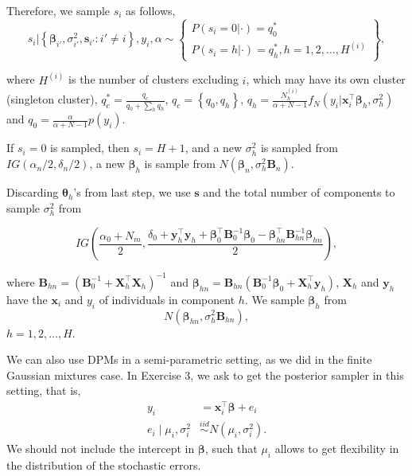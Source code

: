 Therefore, we sample $s_i$ as follows,
\begin{equation*}
	s_i|\left\{\boldsymbol\beta_{i'},\sigma_{i'}^2,\boldsymbol s_{i'}:i'\neq i\right\}, y_i, \alpha\sim\begin{Bmatrix}P(s_i=0|\cdot)=q_0^*\\
		P(s_i=h|\cdot)=q_h^*, h=1,2,\dots,H^{(i)}\end{Bmatrix},
\end{equation*}

where $H^{(i)}$ is the number of clusters excluding $i$, which may have its own cluster (singleton cluster), $q^*_c=\frac{q_c}{q_0+\sum_h q_h}$, $q_c=\left\{q_0,q_h\right\}$, $q_h=\frac{N_h^{(i)}}{\alpha+N-1}f_N(y_i|\boldsymbol{x}_i^{\top}\boldsymbol\beta_h,\sigma_h^2)$ and $q_0=\frac{\alpha}{\alpha+N-1}p(y_i)$.

If $s_i=0$ is sampled, then $s_i=H+1$, and a new $\sigma_h^2$ is sampled from $IG\left(\alpha_n/2,\delta_n/2\right)$, a new $\boldsymbol\beta_h$ is sample from $N(\boldsymbol\beta_n,\sigma_h^2\boldsymbol B_n)$.

Discarding $\boldsymbol\theta_h$'s from last step, we use $\boldsymbol s$ and the total number of components to sample $\sigma_h^2$ from 

\begin{equation*}
	IG\left(\frac{\alpha_0+N_m}{2},\frac{\delta_0+\boldsymbol y_h^{\top}\boldsymbol y_h+\boldsymbol{\beta}_0^{\top}{\boldsymbol{B}}_0^{-1}\boldsymbol{\beta}_0-\boldsymbol{\beta}_{hn}^{\top}{\boldsymbol{B}}_{hn}^{-1}\boldsymbol{\beta}_{hn}}{2}\right),
\end{equation*}

where $\boldsymbol{B}_{hn}=(\boldsymbol{B}_0^{-1}+\boldsymbol{X}_h^{\top}\boldsymbol{X}_h)^{-1}$ and $\boldsymbol{\beta}_{hn}=\boldsymbol{B}_{hn}(\boldsymbol{B}_0^{-1}\boldsymbol{\beta}_0+\boldsymbol{X}_h^{\top}\boldsymbol{y}_h)$, $\boldsymbol{X}_h$ and $\boldsymbol{y}_h$ have the $\boldsymbol{x}_i$ and $y_i$ of individuals in component $h$. We sample $\boldsymbol\beta_h$ from
\begin{equation*}
	N\left({\boldsymbol\beta}_{hn},\sigma_h^2\boldsymbol B_{hn}\right),
\end{equation*}
$h=1,2,\dots,H$.

We can also use DPMs in a semi-parametric setting, as we did in the finite Gaussian mixtures case. In Exercise 3, we ask to get the posterior sampler in this setting, that is,
\begin{align*}
	y_i&=\boldsymbol{x}_i^{\top}\boldsymbol{\beta}+e_i\\
	e_i\mid \mu_i,\sigma_i^2 &\stackrel{iid}{\sim} N(\mu_i,\sigma_i^2).
\end{align*}
We should not include the intercept in $\boldsymbol{\beta}$, such that $\mu_i$ allows to get flexibility in the distribution of the stochastic errors.

